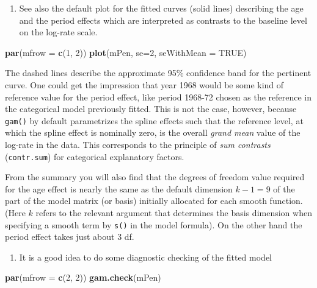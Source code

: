 \documentclass[
]{book}
\newenvironment{Shaded}{\begin{snugshade}}{\end{snugshade}}
\newcommand{\AttributeTok}[1]{\textcolor[rgb]{0.13,0.29,0.53}{#1}}
\newcommand{\ConstantTok}[1]{\textcolor[rgb]{0.56,0.35,0.01}{#1}}
\newcommand{\DecValTok}[1]{\textcolor[rgb]{0.00,0.00,0.81}{#1}}
\newcommand{\FunctionTok}[1]{\textcolor[rgb]{0.13,0.29,0.53}{\textbf{#1}}}
\newcommand{\NormalTok}[1]{#1}
\providecommand{\tightlist}{%
  \setlength{\itemsep}{0pt}\setlength{\parskip}{0pt}}
\begin{document}
\begin{enumerate}
\def\labelenumi{\arabic{enumi}.}
\setcounter{enumi}{1}
\tightlist
\item
  See also the default plot for the fitted curves (solid lines)
  describing the age and the period effects which are interpreted as
  contrasts to the baseline level on the log-rate scale.
\end{enumerate}

\begin{Shaded}
\begin{Highlighting}[]
\FunctionTok{par}\NormalTok{(}\AttributeTok{mfrow =} \FunctionTok{c}\NormalTok{(}\DecValTok{1}\NormalTok{, }\DecValTok{2}\NormalTok{))}
\FunctionTok{plot}\NormalTok{(mPen, }\AttributeTok{se=}\DecValTok{2}\NormalTok{, }\AttributeTok{seWithMean =} \ConstantTok{TRUE}\NormalTok{)}
\end{Highlighting}
\end{Shaded}

The dashed lines describe the approximate 95\% confidence band for the pertinent
curve. One could get the impression that year 1968 would be some kind
of reference value for the period effect, like period 1968-72
chosen as the reference in the categorical
model previously fitted. This is not the case, however, because
\texttt{gam()} by default parametrizes the spline effects such that the
reference level, at which the spline effect is nominally zero, is the
overall \emph{grand mean} value of the log-rate in the data. This
corresponds to the principle of \emph{sum contrasts} (\texttt{contr.sum})
for categorical explanatory factors.

From the summary you will also find that the degrees of freedom value
required for the age effect is nearly the same as the default
dimension \(k-1 = 9\) of the part of the model matrix (or basis)
initially allocated for each smooth function. (Here \(k\) refers to the
relevant argument that determines the basis dimension when specifying
a smooth term by \texttt{s()} in the model formula). On the other
hand the period effect takes just about 3 df.

\begin{enumerate}
\def\labelenumi{\arabic{enumi}.}
\setcounter{enumi}{2}
\tightlist
\item
  It is a good idea to do some diagnostic checking of the fitted
  model
\end{enumerate}

\begin{Shaded}
\begin{Highlighting}[]
\FunctionTok{par}\NormalTok{(}\AttributeTok{mfrow =} \FunctionTok{c}\NormalTok{(}\DecValTok{2}\NormalTok{, }\DecValTok{2}\NormalTok{))}
\FunctionTok{gam.check}\NormalTok{(mPen)}
\end{Highlighting}
\end{Shaded}
\end{document}
